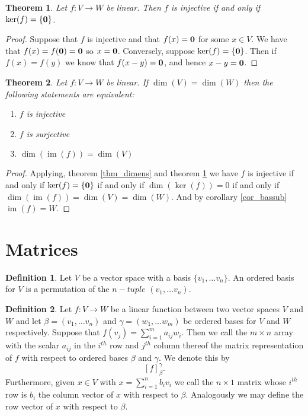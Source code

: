 \documentclass[oneside, 12pt]{book}
\DeclareMathOperator{\im}{im}
\newtheorem{thm}{Theorem}[section]
\theoremstyle{definition}
\newtheorem{defn}{Definition}[section]
\begin{document}
\begin{thm}
\label{thm_inj}
Let $f: V \to W$ be linear. Then $f$ is injective if and only if $\ker(f)=\{\bold{0}\}$.
\end{thm}
\begin{proof}
Suppose that $f$ is injective and that $f(x)=\bold{0}$ for some $x \in V$. We have that $f(x)=f(\bold{0})=\bold{0}$ so $x=\bold{0}$. Conversely, suppose $\ker(f)=\{\bold{0}\}$. Then if $f(x)=f(y)$ we know that $f(x-y)=\bold{0}$, and hence $x-y=\bold{0}$.
\end{proof}
\begin{thm}
\label{thm_injsur}
  Let $f: V \to W$ be linear. If $\dim(V)=\dim(W)$ then the following statements are equivalent:
  \begin{enumerate}
    \item $f$ is injective
    \item $f$ is surjective
    \item $\dim(\im(f))=\dim(V)$
  \end{enumerate}
\end{thm}
\begin{proof}
  Applying, theorem \ref{thm_dimens} and theorem \ref{thm_inj} we have $f$ is injective if and only if $\ker(f)=\{\bold{0}\}$ if and only if $\dim(\ker(f))=0$ if and only if $\dim(\im(f))=\dim(V)=\dim(W)$. And by corollary \ref{cor_bassub} $\im(f)=W$.
\end{proof}
\section{Matrices}
\begin{defn}
\label{defn_orbase}
Let $V$ be a vector space with a basis $\{v_{1},\dots v_{n}\}$. An ordered basis for $V$ is a permutation of the $n-tuple$ $(v_{1}, \dots v_{n})$.
\end{defn}

\begin{defn}
\label{defn_mat}
  Let $f: V \to W$ be a linear function between two vector spaces $V$ and $W$ and let $\beta=(v_{1}, \dots v_{n})$ and $\gamma=(w_{1}, \dots w_{m})$ be ordered bases for $V$ and $W$ respectively. Suppose that $f(v_{j})=\sum\limits_{i=1}^{m}a_{ij}w_{i}$. Then we call the $m \times n$ array with the scalar $a_{ij}$ in the $i^{th}$ row and $j^{th}$ column thereof the matrix representation of $f$ with respect to ordered bases $\beta$ and $\gamma$. We denote this by \[[f]_{\beta}^{\gamma} .\] Furthermore, given $x \in V$ with $x=\sum\limits_{i=1}^{n}b_{i}v_{i}$ we call the $n \times 1$ matrix whose $i^{th}$ row is $b_{i}$ the column vector of $x$ with respect to $\beta$. Analogously we may define the row vector of $x$ with respect to $\beta$.
\end{defn}
\end{document}
